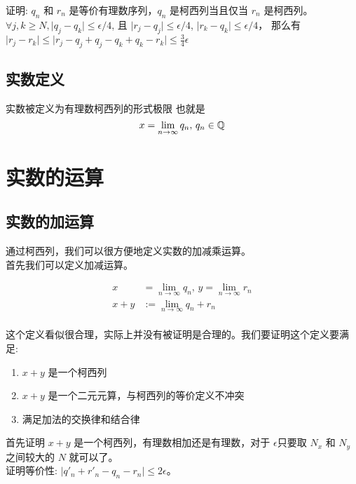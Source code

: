 证明: $q_n$ 和 $r_n$ 是等价有理数序列，$q_n$ 是柯西列当且仅当 $r_n$ 是柯西列。 \\

$\forall j, k \ge N, \lvert q_j - q_k \rvert \le \epsilon/4 $, 且 $ \lvert r_j - q_j \rvert \le \epsilon / 4 $, $\lvert r_k - q_k \rvert \le \epsilon / 4$， 那么有
$\lvert r_j - r_k \rvert \le \lvert  r_j - q_j + q_j - q_k + q_k - r_k \rvert \le \frac{3}{4} \epsilon $

\subsection{实数定义}

实数被定义为有理数柯西列的形式极限 也就是 
\[ x = \lim_{n \to \infty} q_n,\, q_n \in \mathbb{Q} \]

\section{实数的运算}

\subsection{实数的加运算}

通过柯西列，我们可以很方便地定义实数的加减乘运算。 \\
首先我们可以定义加减运算。

\begin{align*} 
x & = \lim_{n \to \infty}q_n,\, y  = \lim_{n \to \infty} r_n \\
x + y & := \lim_{n \to \infty} q_n + r_n 
\end{align*} \\

这个定义看似很合理，实际上并没有被证明是合理的。我们要证明这个定义要满足:

\begin{enumerate}
    \item $x +y $ 是一个柯西列
    \item $x + y$ 是一个二元元算，与柯西列的等价定义不冲突
    \item 满足加法的交换律和结合律
\end{enumerate}

首先证明 $x +y $ 是一个柯西列，有理数相加还是有理数，对于 $\epsilon $只要取 $N_x $ 和 $N_y$ 之间较大的 $N$ 就可以了。\\

证明等价性: $ \lvert q'_n + r'_n - q_n - r_n \rvert \le 2\epsilon $。\\


